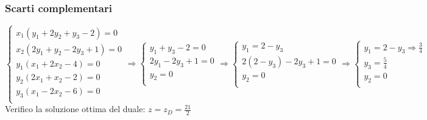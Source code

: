 \documentclass[\main/main.tex]{subfiles}
\begin{document}
\subsubsection*{Scarti complementari}
\[
  \begin{cases}
    x_1(y_1 + 2y_2 + y_3 - 2) = 0 \\
    x_2(2y_1 + y_2 - 2y_3 +1) = 0 \\
    y_1(x_1 + 2x_2 - 4) = 0       \\
    y_2(2x_1 + x_2 - 2) = 0       \\
    y_3(x_1 - 2x_2 - 6) = 0       \\
  \end{cases}
  \Rightarrow
  \begin{cases}
    y_1  + y_3 - 2 = 0 \\
    2y_1 - 2y_3 +1 = 0 \\
    y_2 = 0            \\
  \end{cases}
  \Rightarrow
  \begin{cases}
    y_1 = 2-y_3            \\
    2(2-y_3) - 2y_3 +1 = 0 \\
    y_2 = 0                \\
  \end{cases}
  \Rightarrow
  \begin{cases}
    y_1 = 2-y_3  \Rightarrow \frac{3}{4} \\
    y_3 = \frac{5}{4}                    \\
    y_2 = 0                              \\
  \end{cases}
\]
Verifico la soluzione ottima del duale: $z = z_D = \frac{21}{2}$
\end{document}
